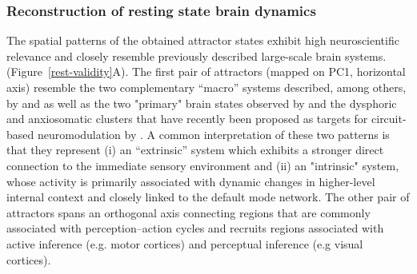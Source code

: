 \documentclass{article}
\begin{document}
\subsubsection{Reconstruction of resting state brain dynamics}\label{Reconstruction of resting state brain dynamics}

The spatial patterns of the obtained attractor states exhibit high neuroscientific relevance and closely resemble previously described large-scale brain systems. (Figure~\ref{rest-validity}A). The first pair of attractors (mapped on PC1, horizontal axis) resemble the two complementary ``macro'' systems described, among others, by \citet{golland2008data} and \citet{cioli2014differences} as well as the two "primary" brain states observed by \citet{chen2018human} and the dysphoric and anxiosomatic clusters that have recently been proposed as targets for circuit-based neuromodulation by \citet{siddiqi2020distinct}. A common interpretation of these two patterns is that they represent (i) an ``extrinsic'' system
which exhibits a stronger direct connection to the immediate sensory environment and (ii) an "intrinsic" system, whose
activity is primarily associated with dynamic changes in higher-level internal context and closely linked to the default
mode network.
The other pair of attractors spans an orthogonal axis connecting regions that are commonly associated
with perception--action cycles \citep{fuster2004upper} and recruits regions associated with active inference (e.g. motor cortices) and perceptual inference (e.g visual cortices).
\end{document}
